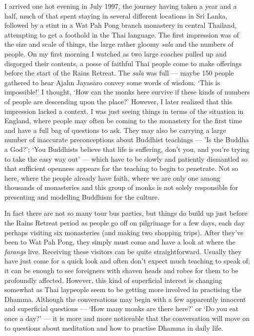 I arrived one hot evening in July 1997, the journey having taken a year
and a half, much of that spent staying in several different locations in
Sri Lanka, followed by a stint in a Wat Pah Pong branch monastery in
central Thailand, attempting to get a foothold in the Thai language. The
first impression was of the size and scale of things, the large rather
gloomy \emph{sala} and the numbers of people. On my first morning I
watched as two large coaches pulled up and disgorged their contents, a
posse of faithful Thai people come to make offerings before the start of
the Rains Retreat. The \emph{sala} was full --- maybe 150 people
gathered to hear Ajahn Jayasāro convey some words of wisdom. `This is
impossible!' I thought, `How can the monks here survive if these kinds
of numbers of people are descending upon the place?' However, I later
realized that this impression lacked a context. I was just seeing things
in terms of the situation in England, where people may often be coming
to the monastery for the first time and have a full bag of questions to
ask. They may also be carrying a large number of inaccurate
preconceptions about Buddhist teachings --- 'Is the Buddha a God?'; `You
Buddhists believe that life is suffering, don't you, and you're trying
to take the easy way out' --- which have to be slowly and patiently
dismantled so that sufficient openness appears for the teaching to begin
to penetrate. Not so here, where the people already have faith, where we
are only one among thousands of monasteries and this group of monks is
not solely responsible for presenting and modelling Buddhism for the
culture.

In fact there are not so many tour bus parties, but things do build up
just before the Rains Retreat period as people go off on pilgrimage for
a few days, each day perhaps visiting six monasteries (and making two
shopping trips). After they've been to Wat Pah Pong, they simply must
come and have a look at where the \emph{farangs} live. Receiving these
visitors can be quite straightforward. Usually they have just come for a
quick look and often don't expect much teaching to speak of; it can be
enough to see foreigners with shaven heads and robes for them to be
profoundly affected. However, this kind of superficial interest is
changing somewhat as Thai laypeople seem to be getting more involved in
practising the Dhamma. Although the conversations may begin with a few
apparently innocent and superficial questions --- `How many monks are
there here?' or `Do you eat once a day?' --- it is more and more
noticeable that the conversation will move on to questions about
meditation and how to practise Dhamma in daily life.

